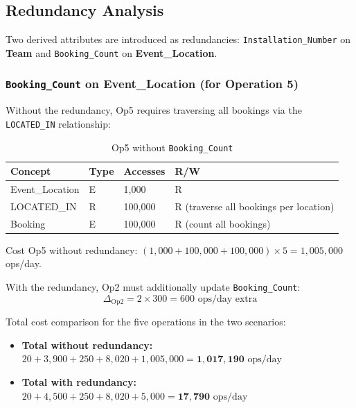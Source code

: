 \documentclass[12pt]{article}
\begin{document}
\subsection{Redundancy Analysis}

Two derived attributes are introduced as redundancies: \texttt{Installation\_Number} on \textbf{Team}
and \texttt{Booking\_Count} on \textbf{Event\_Location}.

\subsubsection{\texttt{Booking\_Count} on Event\_Location (for Operation 5)}

Without the redundancy, Op5 requires traversing all bookings via the \texttt{LOCATED\_IN} relationship:
\begin{table}[H]
  \renewcommand{\arraystretch}{1.3}
  \begin{tabularx}{\textwidth}{|X|X|X|X|}
  \hline \textbf{Concept} & \textbf{Type} & \textbf{Accesses} & \textbf{R/W} \\ \hline
  Event\_Location & E & 1{,}000    & R \\ \hline
  LOCATED\_IN     & R & 100{,}000  & R (traverse all bookings per location) \\ \hline
  Booking         & E & 100{,}000  & R (count all bookings) \\ \hline
  \end{tabularx}
  \caption{Op5 without \texttt{Booking\_Count}}
\end{table}
\noindent Cost Op5 without redundancy: $(1{,}000 + 100{,}000 + 100{,}000) \times 5 = 1{,}005{,}000$ ops/day.

\noindent With the redundancy, Op2 must additionally update \texttt{Booking\_Count}:
\[
  \Delta_{\text{Op2}} = 2 \times 300 = 600 \text{ ops/day extra}
\]

\noindent Total cost comparison for the five operations in the two scenarios:
\begin{itemize}
    \item \textbf{Total without redundancy:} \\
    $20 + 3{,}900 + 250 + 8{,}020 + 1{,}005{,}000 = \mathbf{1{,}017{,}190} \text{ ops/day}$

    \item \textbf{Total with redundancy:} \\
    $20 + 4{,}500 + 250 + 8{,}020 + 5{,}000 = \mathbf{17{,}790} \text{ ops/day}$
\end{itemize}
\end{document}
